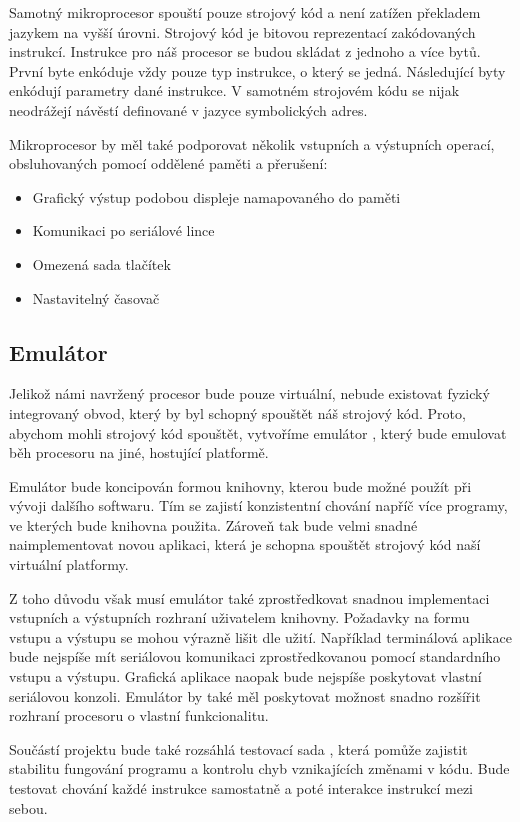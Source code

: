 Samotný mikroprocesor spouští pouze strojový kód a není zatížen překladem jazykem na vyšší úrovni. Strojový kód je bitovou reprezentací zakódovaných instrukcí. Instrukce pro náš procesor se budou skládat z jednoho a více bytů. První byte enkóduje vždy pouze typ instrukce, o který se jedná. Následující byty enkódují parametry dané instrukce. V samotném strojovém kódu se nijak neodrážejí návěstí definované v jazyce symbolických adres.

Mikroprocesor by měl také podporovat několik vstupních a výstupních operací, obsluhovaných pomocí oddělené paměti a přerušení:

\begin{itemize}
	\item Grafický výstup podobou displeje namapovaného do paměti
	\item Komunikaci po seriálové lince
	\item Omezená sada tlačítek
	\item Nastavitelný časovač
\end{itemize}

\subsection{Emulátor}

Jelikož námi navržený procesor bude pouze virtuální, nebude existovat fyzický integrovaný obvod, který by byl schopný spouštět náš strojový kód. Proto, abychom mohli strojový kód spouštět, vytvoříme emulátor , který bude emulovat běh procesoru na jiné, hostující platformě.

Emulátor bude koncipován formou knihovny, kterou bude možné použít při vývoji dalšího softwaru. Tím se zajistí konzistentní chování napříč více programy, ve kterých bude knihovna použita. Zároveň tak bude velmi snadné naimplementovat novou aplikaci, která je schopna spouštět strojový kód naší virtuální platformy.

Z toho důvodu však musí emulátor také zprostředkovat snadnou implementaci vstupních a výstupních rozhraní uživatelem knihovny. Požadavky na formu vstupu a výstupu se mohou výrazně lišit dle užití. Například terminálová aplikace bude nejspíše mít seriálovou komunikaci zprostředkovanou pomocí standardního vstupu a výstupu. Grafická aplikace naopak bude nejspíše poskytovat vlastní seriálovou konzoli. Emulátor by také měl poskytovat možnost snadno rozšířit rozhraní procesoru o vlastní funkcionalitu.

Součástí projektu bude také rozsáhlá testovací sada , která pomůže zajistit stabilitu fungování programu a kontrolu chyb vznikajících změnami v kódu. Bude testovat chování každé instrukce samostatně a poté interakce instrukcí mezi sebou.

